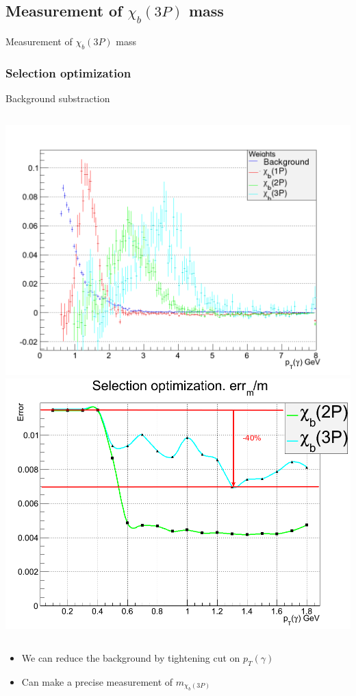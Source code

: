 \documentclass{beamer}
\begin{document}
\subsection{Measurement of $\chi_{b}(3P)$ mass}
\begin{frame}
\begin{exampleblock}{}
    \begin{center}
        {\huge Measurement of $\chi_{b}(3P)$ mass}
    \end{center}
\end{exampleblock}
\end{frame}
\begin{frame}
\frametitle{Selection optimization}
Background substraction
\begin{columns}[c]
\includegraphics[width=\textwidth]{images/splot.png}
\includegraphics[width=\textwidth]{images/plot_rerr_m3p.png}
\end{columns}
\begin{itemize}
  \item We can reduce the background by tightening cut on $p_T(\gamma)$
  \item Can make a precise measurement of $m_{\chi_b(3P)}$
\end{itemize}
\end{frame}
\end{document}
